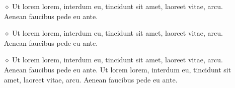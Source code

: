 \begin{itemize}
\item[\textcolor{QuarkColor}{$\diamond$}]  Ut lorem lorem, interdum eu, tincidunt sit amet, laoreet vitae, arcu. Aenean faucibus pede eu ante. 
\item[\textcolor{QuarkColor}{$\diamond$}]  Ut lorem lorem, interdum eu, tincidunt sit amet, laoreet vitae, arcu. Aenean faucibus pede eu ante. 
\item[\textcolor{QuarkColor}{$\diamond$}]  Ut lorem lorem, interdum eu, tincidunt sit amet, laoreet vitae, arcu. Aenean faucibus pede eu ante. Ut lorem lorem, interdum eu, tincidunt sit amet, laoreet vitae, arcu. Aenean faucibus pede eu ante. 
\end{itemize}




